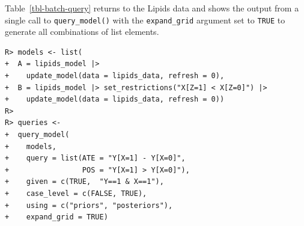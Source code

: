 \documentclass[
  11pt,
  article]{jss}
\begin{document}
Table~\ref{tbl-batch-query} returns to the Lipids data and shows the
output from a single call to \texttt{query\_model()} with the
\texttt{expand\_grid} argument set to \texttt{TRUE} to generate all
combinations of list elements.

\begin{verbatim}
R> models <- list(
+  A = lipids_model |> 
+    update_model(data = lipids_data, refresh = 0),
+  B = lipids_model |> set_restrictions("X[Z=1] < X[Z=0]") |>
+    update_model(data = lipids_data, refresh = 0))
R> 
R> queries <- 
+  query_model(
+    models,  
+    query = list(ATE = "Y[X=1] - Y[X=0]", 
+                 POS = "Y[X=1] > Y[X=0]"),
+    given = c(TRUE,  "Y==1 & X==1"),
+    case_level = c(FALSE, TRUE),
+    using = c("priors", "posteriors"),
+    expand_grid = TRUE)
\end{verbatim}
\end{document}
